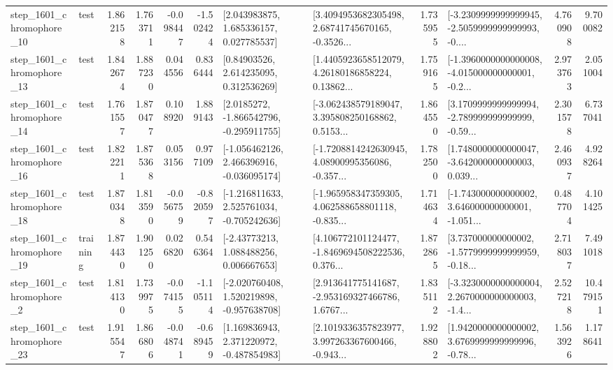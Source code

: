 \begin{tabular}{llrrrrllrlrr}
 step\_1601\_chromophore\_10 &      test &      1.862158 &    1.763711 &     -0.098447 & -1.502424 &     [2.043983875, 1.685336157, 0.027785537] &  [3.4094953682305498, 2.68741745670165, -0.3526... &       1.735955 &  [-3.2309999999999945, -2.5059999999999993, -0.... &            4.760908 &          9.700082 \\
 step\_1601\_chromophore\_13 &      test &      1.842674 &    1.887230 &      0.044556 &  0.836444 &      [0.84903526, 2.614235095, 0.312536269] &  [1.4405923658512079, 4.26180186858224, 0.13862... &       1.759165 &  [-1.3960000000000008, -4.015000000000001, -0.2... &            2.973763 &          2.051004 \\
 step\_1601\_chromophore\_14 &      test &      1.761557 &    1.870477 &      0.108920 &  1.889143 &     [2.0185272, -1.866542796, -0.295911755] &  [-3.062438579189047, 3.395808250168862, 0.5153... &       1.864550 &  [3.1709999999999994, -2.789999999999999, -0.59... &            2.301578 &          6.737041 \\
 step\_1601\_chromophore\_16 &      test &      1.822211 &    1.875368 &      0.053156 &  0.977109 &   [-1.056462126, 2.466396916, -0.036095174] &  [-1.7208814242630945, 4.08900995356086, -0.357... &       1.782500 &  [1.7480000000000047, -3.642000000000003, 0.039... &            2.460937 &          4.928264 \\
 step\_1601\_chromophore\_18 &      test &      1.870348 &    1.813590 &     -0.056759 & -0.820597 &   [-1.216811633, 2.525761034, -0.705242636] &  [-1.965958347359305, 4.062588658801118, -0.835... &       1.714634 &  [-1.743000000000002, 3.646000000000001, -1.051... &            0.487704 &          4.101425 \\
 step\_1601\_chromophore\_19 &  training &      1.874430 &    1.901250 &      0.026820 &  0.546364 &     [-2.43773213, 1.088488256, 0.006667653] &  [4.106772101124477, -1.8469694508222536, 0.376... &       1.872865 &  [3.737000000000002, -1.5779999999999959, -0.18... &            2.718037 &          7.491018 \\
  step\_1601\_chromophore\_2 &      test &      1.814130 &    1.739975 &     -0.074155 & -1.105114 &   [-2.020760408, 1.520219898, -0.957638708] &  [2.913641775141687, -2.953169327466786, 1.6767... &       1.835112 &  [-3.3230000000000004, 2.2670000000000003, -1.4... &            2.527218 &         10.479151 \\
 step\_1601\_chromophore\_23 &      test &      1.915547 &    1.866806 &     -0.048741 & -0.689459 &    [1.169836943, 2.371220972, -0.487854983] &  [2.1019336357823977, 3.997263367600466, -0.943... &       1.928802 &  [1.9420000000000002, 3.6769999999999996, -0.78... &            1.563926 &          1.178641 \\

\end{tabular}
